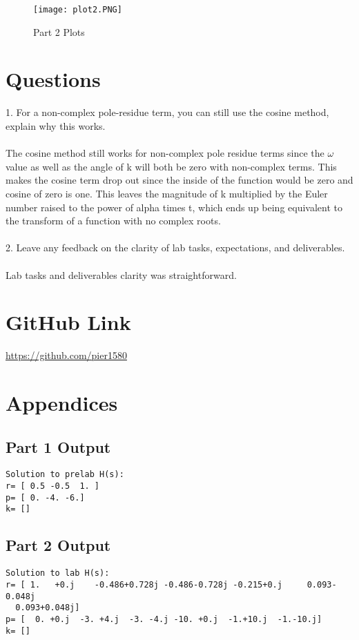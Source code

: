 \begin{figure}[H]
	   \centering
	   \texttt{[image: plot2.PNG]}
	   \caption{Part 2 Plots}
 \end{figure}


\section{Questions}
1. For a non-complex pole-residue term, you can still use the cosine method, explain why this works.
\\ \\
The cosine method still works for non-complex pole residue terms since the $\omega$ value as well as the angle of k will both be zero with non-complex terms.  This makes the cosine term drop out since the inside of the function would be zero and cosine of zero is one.  This leaves the magnitude of k multiplied by the Euler number raised to the power of alpha times t, which ends up being equivalent to the transform of a function with no complex roots.
\\ \\
2. Leave any feedback on the clarity of lab tasks, expectations, and deliverables.
\\ \\
Lab tasks and deliverables clarity was straightforward.  


\section{GitHub Link}
\url{https://github.com/pier1580}

\appendix
\section{Appendices}
\subsection{Part 1 Output}
\begin{scriptsize}
\begin{lstlisting}
Solution to prelab H(s):
r= [ 0.5 -0.5  1. ]
p= [ 0. -4. -6.]
k= []
\end{lstlisting}
\end{scriptsize}

\subsection{Part 2 Output}
\begin{scriptsize}
\begin{lstlisting}
Solution to lab H(s):
r= [ 1.   +0.j    -0.486+0.728j -0.486-0.728j -0.215+0.j     0.093-0.048j
  0.093+0.048j]
p= [  0. +0.j  -3. +4.j  -3. -4.j -10. +0.j  -1.+10.j  -1.-10.j]
k= []
\end{lstlisting}
\end{scriptsize}




